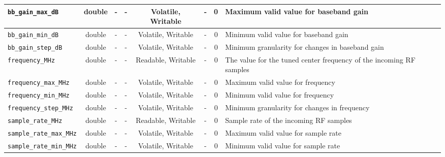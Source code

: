 \begin{landscape}
\begin{scriptsize}
\begin{tabular}{|p{4cm}|c|c|c|c|c|c|p{8cm}|}
			\hline
			\verb+bb_gain_max_dB+               & double & -        & -          & Volatile, Writable & -           & 0       & Maximum valid value for baseband gain                                                      \\
			\hline
			\verb+bb_gain_min_dB+               & double & -        & -          & Volatile, Writable & -           & 0       & Minimum valid value for baseband gain                                                      \\
			\hline
			\verb+bb_gain_step_dB+              & double & -        & -          & Volatile, Writable & -           & 0       & Minimum granularity for changes in baseband gain                                           \\
			\hline
			\verb+frequency_MHz+                & double & -        & -          & Readable, Writable  & -           & 0       & The value for the tuned center frequency of the incoming RF samples                        \\
			\hline
			\verb+frequency_max_MHz+            & double & -        & -          & Volatile, Writable & -           & 0       & Maximum valid value for frequency                                                          \\
			\hline
			\verb+frequency_min_MHz+            & double & -        & -          & Volatile, Writable & -           & 0       & Minimum valid value for frequency                                                          \\
			\hline
			\verb+frequency_step_MHz+           & double & -        & -          & Volatile, Writable & -           & 0       & Minimum granularity for changes in frequency                                               \\
			\hline
			\verb+sample_rate_MHz+              & double & -        & -          & Readable, Writable  & -           & 0       & Sample rate of the incoming RF samples                                                     \\
			\hline
			\verb+sample_rate_max_MHz+          & double & -        & -          & Volatile, Writable & -           & 0       & Maximum valid value for sample rate                                                        \\
			\hline
			\verb+sample_rate_min_MHz+          & double & -        & -          & Volatile, Writable & -           & 0       & Minimum valid value for sample rate                                                        \\

\end{tabular}
\end{scriptsize}
\end{landscape}
